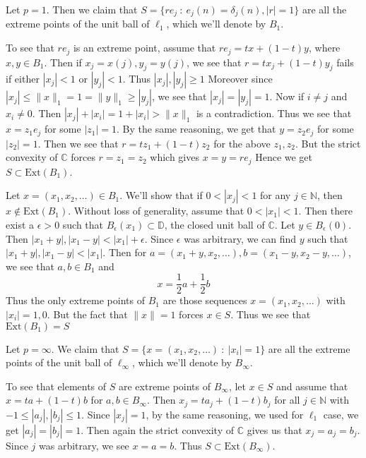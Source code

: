 \documentclass[12pt]{exam}
\theoremstyle{plain} %
\theoremstyle{definition} %
\theoremstyle{remark} %
\begin{document}
\begin{questions}
\begin{solution}
\begin{parts}
\begin{subparts}
        \subpart
        Let $p = 1$. Then we claim that $S = \{ re_j  \ : \
        e_j(n) = \delta_j(n), |r| = 1 \}$ are all the extreme points of the
        unit ball of $\ell_1$, which we'll denote by $B_1$.

        To see that $re_j$ is an extreme point, assume that $re_j = tx
        + (1-t)y$, where $x, y \in B_1$. Then if $x_j = x(j), y_j =
        y(j)$, we see that $r = tx_j + (1-t)y_j$ fails if either $|x_j|
        < 1$ or $|y_j| < 1$. Thus $|x_j|, |y_j| \ge 1$ Moreover since
        $|x_j| \le \|x\|_1 = 1 = \|y\|_1 \ge |y_j|$, we see that $|x_j| =
        |y_j| = 1$. Now if $i \neq j$ and $x_i \neq 0$. Then $|x_j| +
        |x_i| = 1 + |x_i| > \|x\|_1$ is a contradiction. Thus we see
        that $x = z_1e_j$ for some $|z_1| = 1$. By the same reasoning, we
        get that $y = z_2e_j$ for some $|z_2| = 1$. Then we see that
        $r = tz_1 + (1-t) z_2$ for the above $z_1, z_{2}$. But the
        strict convexity of $\mathbb{C}$ forces $ r = z_{1} = z_2$
        which gives $x = y = re_j$
        Hence we get $S \subset \textrm{Ext}(B_1)$.

        Let $x = (x_1 , x_2,  \ldots) \in B_1$. We'll show that if $0
        < |x_j|< 1$ for any $j \in \mathbb{N}$, then $x \notin
        \textrm{Ext}(B_1)$. Without loss of generality, assume that
        $0 < |x_1|< 1$.
        Then there exist a $\epsilon> 0$ such that $B_\epsilon(x_1)
        \subset \mathbb{D}$, the closed unit ball of $\mathbb{C}$.
        Let $y \in B_\epsilon(0)$. Then $|x_1 + y|, |x_1 - y| <
        |x_1| + \epsilon$. Since $\epsilon$ was arbitrary, we can
        find $y$ such that $|x_1 + y| , |x_1 - y| < |x_1|$. Then for
        $a = (x_1 + y, x_2, \ldots), b = ( x_1 - y, x_2 - y,
        \ldots)$, we see that $a, b \in B_1$ and  \[
          x = \frac{1}{2}a + \frac{1}{2}b
        \]
        Thus the only extreme points of $B_1$ are those sequences $x
        = (x_1 , x_2 , \ldots)$ with $|x_i| = 1, 0$. But the fact
        that $\|x\| = 1$ forces $x \in S$. Thus we see that
        $\textrm{Ext}(B_1) = S$

        \subpart
        Let $p = \infty$. We claim that $S = \{ x = (x_1 , x_2 ,
        \ldots )  \ : \ |x_i|= 1  \}$ are all the extreme
        points of the unit ball of $\ell_\infty$, which we'll denote
        by $B_\infty$.

        To see that elements of $S$ are extreme points of $B_\infty$,
        let $x \in S$ and assume that $x = ta + (1-t)b$ for $a, b \in
        B_\infty$. Then $x_j = ta_j + (1-t) b_j$ for all $j \in
        \mathbb{N}$ with $-1 \le |a_j|, |b_j| \le 1$. Since $|x_j| = 1$, by
        the same reasoning, we used for
        $\ell_1$ case, we get $|a_j| = |b_j| = 1$. Then again the
        strict convexity of $\mathbb{C}$ gives us that $x_j = a_j =
        b_j$.  Since $j$ was
        arbitrary, we see $x = a = b$. Thus
        $S \subset \textrm{Ext}(B_\infty)$.


\end{subparts}
\end{parts}
\end{solution}
\end{questions}
\end{document}
